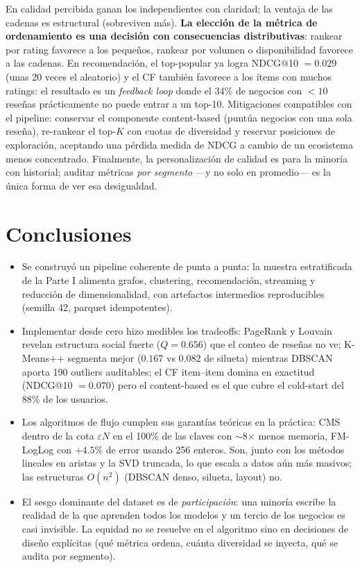 \documentclass[conference]{IEEEtran}
\begin{document}
En calidad percibida ganan los independientes con claridad; la ventaja de las cadenas es estructural (sobreviven más). \textbf{La elección de la métrica de ordenamiento es una decisión con consecuencias distributivas}: rankear por rating favorece a los pequeños, rankear por volumen o disponibilidad favorece a las cadenas. En recomendación, el top-popular ya logra NDCG@10 $=0.029$ (unas 20 veces el aleatorio) y el CF también favorece a los ítems con muchos ratings: el resultado es un \emph{feedback loop} donde el 34\% de negocios con $<10$ reseñas prácticamente no puede entrar a un top-10. Mitigaciones compatibles con el pipeline: conservar el componente content-based (puntúa negocios con una sola reseña), re-rankear el top-$K$ con cuotas de diversidad y reservar posiciones de exploración, aceptando una pérdida medida de NDCG a cambio de un ecosistema menos concentrado. Finalmente, la personalización de calidad es para la minoría con historial; auditar métricas \emph{por segmento} ---y no solo en promedio--- es la única forma de ver esa desigualdad.

\section{Conclusiones}
\begin{itemize}
\item Se construyó un pipeline coherente de punta a punta: la muestra estratificada de la Parte I alimenta grafos, clustering, recomendación, streaming y reducción de dimensionalidad, con artefactos intermedios reproducibles (semilla 42, parquet idempotentes).
\item Implementar desde cero hizo medibles los tradeoffs: PageRank y Louvain revelan estructura social fuerte ($Q=0.656$) que el conteo de reseñas no ve; K-Means++ segmenta mejor ($0.167$ vs $0.082$ de silueta) mientras DBSCAN aporta 190 outliers auditables; el CF item--item domina en exactitud (NDCG@10 $=0.070$) pero el content-based es el que cubre el cold-start del 88\% de los usuarios.
\item Los algoritmos de flujo cumplen sus garantías teóricas en la práctica: CMS dentro de la cota $\varepsilon N$ en el 100\% de las claves con $\sim$8$\times$ menos memoria, FM-LogLog con $+4.5\%$ de error usando 256 enteros. Son, junto con los métodos lineales en aristas y la SVD truncada, lo que escala a datos aún más masivos; las estructuras $O(n^2)$ (DBSCAN denso, silueta, layout) no.
\item El sesgo dominante del dataset es de \emph{participación}: una minoría escribe la realidad de la que aprenden todos los modelos y un tercio de los negocios es casi invisible. La equidad no se resuelve en el algoritmo sino en decisiones de diseño explícitas (qué métrica ordena, cuánta diversidad se inyecta, qué se audita por segmento).
\end{itemize}
\end{document}
